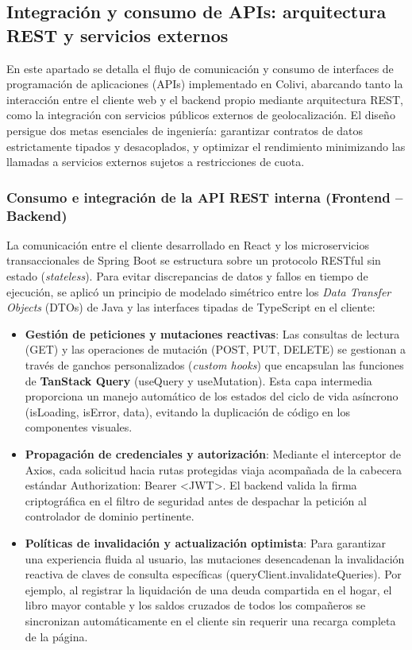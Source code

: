 \subsection{Integración y consumo de APIs: arquitectura REST y servicios externos}
\label{subsec:integracion_apis}

En este apartado se detalla el flujo de comunicación y consumo de interfaces de programación de aplicaciones (APIs) implementado en Colivi, abarcando tanto la interacción entre el cliente web y el backend propio mediante arquitectura REST, como la integración con servicios públicos externos de geolocalización. El diseño persigue dos metas esenciales de ingeniería: garantizar contratos de datos estrictamente tipados y desacoplados, y optimizar el rendimiento minimizando las llamadas a servicios externos sujetos a restricciones de cuota.

\subsubsection{Consumo e integración de la API REST interna (Frontend -- Backend)}

La comunicación entre el cliente desarrollado en React y los microservicios transaccionales de Spring Boot se estructura sobre un protocolo RESTful sin estado (\emph{stateless}). Para evitar discrepancias de datos y fallos en tiempo de ejecución, se aplicó un principio de modelado simétrico entre los \emph{Data Transfer Objects} (DTOs) de Java y las interfaces tipadas de TypeScript en el cliente:

\begin{itemize}
    \item \textbf{Gestión de peticiones y mutaciones reactivas}: Las consultas de lectura (GET) y las operaciones de mutación (POST, PUT, DELETE) se gestionan a través de ganchos personalizados (\emph{custom hooks}) que encapsulan las funciones de \textbf{TanStack Query} (useQuery y useMutation). Esta capa intermedia proporciona un manejo automático de los estados del ciclo de vida asíncrono (isLoading, isError, data), evitando la duplicación de código en los componentes visuales.
    \item \textbf{Propagación de credenciales y autorización}: Mediante el interceptor de Axios, cada solicitud hacia rutas protegidas viaja acompañada de la cabecera estándar Authorization: Bearer <JWT>. El backend valida la firma criptográfica en el filtro de seguridad antes de despachar la petición al controlador de dominio pertinente.
    \item \textbf{Políticas de invalidación y actualización optimista}: Para garantizar una experiencia fluida al usuario, las mutaciones desencadenan la invalidación reactiva de claves de consulta específicas (queryClient.invalidateQueries). Por ejemplo, al registrar la liquidación de una deuda compartida en el hogar, el libro mayor contable y los saldos cruzados de todos los compañeros se sincronizan automáticamente en el cliente sin requerir una recarga completa de la página.
\end{itemize}

